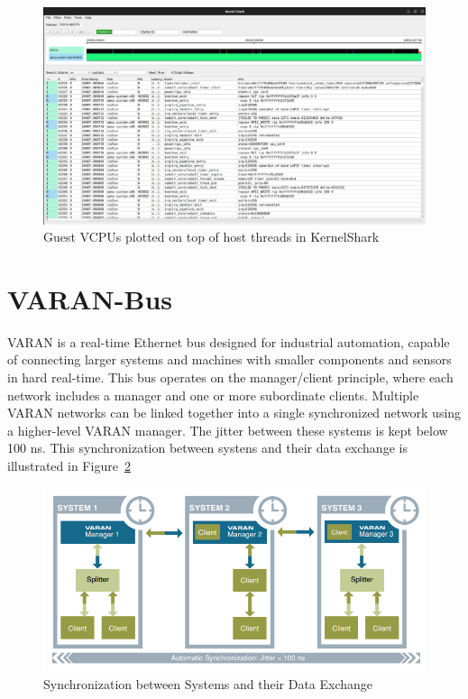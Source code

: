 \documentclass[MMR,Master,english]{twbook}
\begin{document}
\begin{figure}[H]
	\centering
	\includegraphics[width=1.0\columnwidth]{img/kernelshark_combo.png}
	\caption[Guest VCPUs plotted on top of host threads in KernelShark]{Guest VCPUs plotted on top of host threads in KernelShark}
	\label{fig:kernelshark_combo}
\end{figure}

\section{VARAN-Bus}\label{sec:varan}

VARAN is a real-time Ethernet bus designed for industrial automation, capable of connecting larger systems and machines with smaller components and sensors in hard real-time. This bus operates on the manager/client principle, where each network includes a manager and one or more subordinate clients. Multiple VARAN networks can be linked together into a single synchronized network using a higher-level VARAN manager. The jitter between these systems is kept below 100 ns. This synchronization between systens and their data exchange is illustrated in Figure~\ref{fig:multiple_varans}

\begin{figure}[H]
	\centering
	\includegraphics[width=0.75\columnwidth]{img/multiple_varans.png}
	\caption[Synchronization between Systems and their Data Exchange]{Synchronization between Systems and their Data Exchange}
	\label{fig:multiple_varans}
\end{figure}
\end{document}
